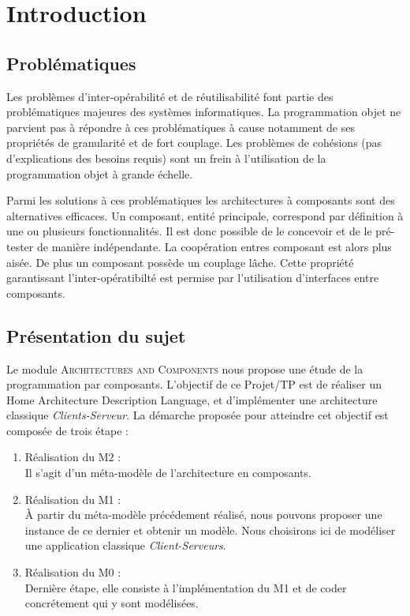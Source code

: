 \chapter{Introduction}\label{chap:Intro}

\section{Problématiques}
Les problèmes d'inter-opérabilité et de réutilisabilité font partie des problématiques majeures des systèmes informatiques. La programmation objet ne parvient pas à répondre à ces problématiques à cause notamment de ses propriétés de granularité et de fort couplage. Les problèmes de cohésions (pas d'explications des besoins requis) sont un frein à l'utilisation de la programmation objet à grande échelle. 

Parmi les solutions à ces problématiques les architectures à composants sont des alternatives efficaces. Un composant, entité principale, correspond par définition à une ou plusieurs fonctionnalités. Il est donc possible de le concevoir et de le pré-tester de manière indépendante. La coopération entres composant est alors plus aisée. De plus un composant possède un couplage lâche. Cette propriété garantissant l'inter-opératibilté est permise par l'utilisation d'interfaces entre composants. 

\section{Présentation du sujet}
Le module \textsc{Architectures and Components} nous propose une étude de la programmation par composants. L'objectif de ce Projet/TP  est de réaliser un Home Architecture Description Language, et d'implémenter une architecture classique \emph{Clients-Serveur}. La démarche proposée pour atteindre cet objectif est composée de trois étape : 


\begin{enumerate}
\item 
Réalisation du M2 :\hfill \\
Il s'agit d'un méta-modèle de l'architecture en composants.  
\item
Réalisation du M1 :\hfill \\
À partir du méta-modèle précédement réalisé, nous pouvons proposer une instance de ce dernier et obtenir un modèle. Nous choisirons ici de modéliser une application classique \emph{Client-Serveurs}.  
\item
Réalisation du M0 :\hfill \\
Dernière étape, elle consiste à l'implémentation du M1 et de coder concrétement qui y sont modélisées.
\end{enumerate}

